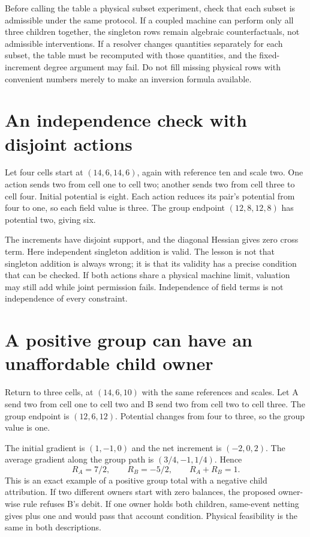 Before calling the table a physical subset experiment, check that each
subset is admissible under the same protocol. If a coupled machine can
perform only all three children together, the singleton rows remain
algebraic counterfactuals, not admissible interventions. If a resolver
changes quantities separately for each subset, the table must be recomputed
with those quantities, and the fixed-increment degree argument may fail.
Do not fill missing physical rows with convenient numbers merely to make
an inversion formula available.

\section{An independence check with disjoint actions}
Let four cells start at $(14,6,14,6)$, again with reference ten and
scale two. One action sends two from cell one to cell two; another sends
two from cell three to cell four. Initial potential is eight. Each action
reduces its pair's potential from four to one, so each field value is
three. The group endpoint $(12,8,12,8)$ has potential two, giving six.

The increments have disjoint support, and the diagonal Hessian gives zero
cross term. Here independent singleton addition is valid. The lesson is
not that singleton addition is always wrong; it is that its validity has
a precise condition that can be checked. If both actions share a physical
machine limit, valuation may still add while joint permission fails.
Independence of field terms is not independence of every constraint.

\section{A positive group can have an unaffordable child owner}
Return to three cells, at $(14,6,10)$ with the same references and
scales. Let A send two from cell one to cell two and B send two from
cell two to cell three. The group endpoint is $(12,6,12)$.
Potential changes from four to three, so the group value is one.

The initial gradient is $(1,-1,0)$ and the net increment is
$(-2,0,2)$. The average gradient along the group path is
$(3/4,-1,1/4)$. Hence
\begin{equation}
 R_A=7/2,\qquad R_B=-5/2,\qquad R_A+R_B=1.
\end{equation}
This is an exact example of a positive group total with a negative
child attribution. If two different owners start with zero balances,
the proposed owner-wise rule refuses B's debit. If one owner holds both
children, same-event netting gives plus one and would pass that account
condition. Physical feasibility is the same in both descriptions.


